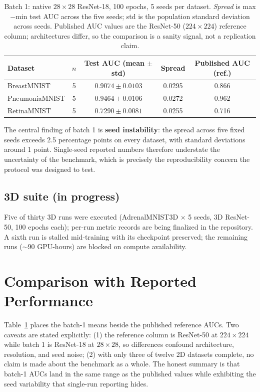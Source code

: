 \documentclass[11pt,a4paper]{article}
\begin{document}
\begin{table}[h]
\centering
\caption{Batch 1: native $28 \times 28$ ResNet-18, 100 epochs, 5 seeds per dataset.
\textit{Spread} is max$-$min test AUC across the five seeds; std is the
population standard deviation across seeds.
Published AUC values are the ResNet-50 ($224 \times 224$) reference column;
architectures differ, so the comparison is a sanity signal, not a replication claim.}
\label{tab:batch1}
\begin{tabular}{lcccc}
\toprule
Dataset & $n$ & Test AUC (mean $\pm$ std) & Spread & Published AUC (ref.) \\
\midrule
BreastMNIST    & 5 & $0.9074 \pm 0.0103$ & 0.0295 & 0.866 \\
PneumoniaMNIST & 5 & $0.9464 \pm 0.0106$ & 0.0272 & 0.962 \\
RetinaMNIST    & 5 & $0.7290 \pm 0.0081$ & 0.0255 & 0.716 \\
\bottomrule
\end{tabular}
\end{table}

The central finding of batch 1 is \textbf{seed instability}: the spread across
five fixed seeds exceeds 2.5 percentage points on every dataset, with standard
deviations around 1 point. Single-seed reported numbers therefore understate
the uncertainty of the benchmark, which is precisely the reproducibility
concern the protocol was designed to test.

\subsection{3D suite (in progress)}

Five of thirty 3D runs were executed (AdrenalMNIST3D $\times$ 5
seeds, 3D ResNet-50, 100 epochs each); per-run metric records are being
finalized in the repository. A sixth run is stalled mid-training with its
checkpoint preserved; the remaining runs ($\sim$90 GPU-hours) are blocked on
compute availability.

\section{Comparison with Reported Performance}

Table~\ref{tab:batch1} places the batch-1 means beside the published reference
AUCs. Two caveats are stated explicitly: (1) the reference column is
ResNet-50 at $224 \times 224$ while batch 1 is ResNet-18 at $28 \times 28$,
so differences confound architecture, resolution, and seed noise; (2) with
only three of twelve 2D datasets complete, no claim is made about the
benchmark as a whole. The honest summary is that batch-1 AUCs land in the same
range as the published values while exhibiting the seed variability that
single-run reporting hides.
\end{document}
